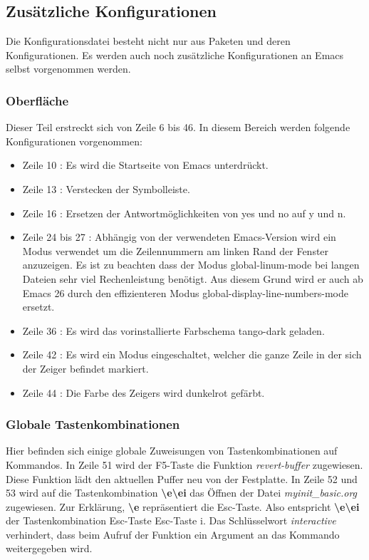 \subsection{Zusätzliche Konfigurationen}
\label{subsec:basiczuskonf}
Die Konfigurationsdatei besteht nicht nur aus Paketen und deren
Konfigurationen. Es werden auch noch zusätzliche Konfigurationen an
Emacs selbst vorgenommen werden.\\

\subsubsection{Oberfläche}
Dieser Teil erstreckt sich von Zeile 6 bis 46. In diesem Bereich
werden folgende Konfigurationen vorgenommen:
\begin{itemize}
\item Zeile 10 : Es wird die Startseite von Emacs unterdrückt.
\item Zeile 13 : Verstecken der Symbolleiste.
\item Zeile 16 : Ersetzen der Antwortmöglichkeiten von
  {\glqq}yes{\grqq} und {\glqq}no{\grqq} auf {\glqq}y{\grqq} und
  {\glqq}n{\grqq}.
\item Zeile 24 bis 27 : Abhängig von der verwendeten Emacs-Version
  wird ein Modus verwendet um die Zeilennummern am linken Rand der
  Fenster anzuzeigen. Es ist zu beachten dass der Modus
  {\glqq}global-linum-mode{\grqq} bei langen Dateien sehr viel
  Rechenleistung benötigt. Aus diesem Grund wird er auch ab Emacs 26
  durch den effizienteren Modus
  {\glqq}global-display-line-numbers-mode{\grqq} ersetzt.
\item Zeile 36 : Es wird das vorinstallierte Farbschema
  {\glqq}tango-dark{\grqq} geladen.
\item Zeile 42 : Es wird ein Modus eingeschaltet, welcher die ganze
  Zeile in der sich der Zeiger befindet markiert.
\item Zeile 44 : Die Farbe des Zeigers wird dunkelrot gefärbt.
\end{itemize}

\subsubsection{Globale Tastenkombinationen}
Hier befinden sich einige globale Zuweisungen von Tastenkombinationen
auf Kommandos. In Zeile 51 wird der F5-Taste die Funktion
\textit{revert-buffer} zugewiesen. Diese Funktion lädt den aktuellen
Puffer neu von der Festplatte. In Zeile 52 und 53 wird auf die
Tastenkombination \textbf{\textbackslash e\textbackslash ei} das Öffnen der Datei
\textit{myinit\_basic.org} zugewiesen. Zur Erklärung, \textbf{\textbackslash e}
repräsentiert die Esc-Taste. Also entspricht \textbf{\textbackslash e\textbackslash ei} der
Tastenkombination {\glqq}Esc-Taste Esc-Taste i{\grqq}. Das
Schlüsselwort \textit{interactive} verhindert, dass beim Aufruf der
Funktion ein Argument an das Kommando weitergegeben wird.\\

